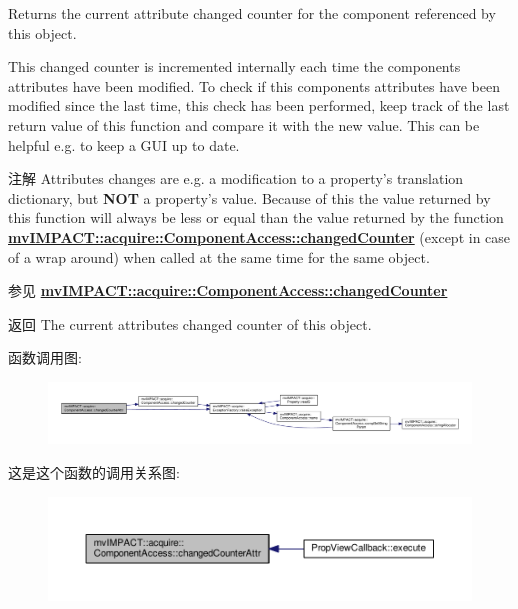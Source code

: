 Returns the current attribute changed counter for the component referenced by this object. 

This changed counter is incremented internally each time the components attributes have been modified. To check if this components attributes have been modified since the last time, this check has been performed, keep track of the last return value of this function and compare it with the new value. This can be helpful e.\+g. to keep a G\+U\+I up to date.

\begin{DoxyNote}{注解}
Attributes changes are e.\+g. a modification to a property's translation dictionary, but {\bfseries N\+O\+T} a property's value. Because of this the value returned by this function will always be less or equal than the value returned by the function {\bfseries \hyperlink{classmv_i_m_p_a_c_t_1_1acquire_1_1_component_access_a9f1ce26fe668a03990316e35882ef82d}{mv\+I\+M\+P\+A\+C\+T\+::acquire\+::\+Component\+Access\+::changed\+Counter}} (except in case of a wrap around) when called at the same time for the same object. 
\end{DoxyNote}
\begin{DoxySeeAlso}{参见}
{\bfseries \hyperlink{classmv_i_m_p_a_c_t_1_1acquire_1_1_component_access_a9f1ce26fe668a03990316e35882ef82d}{mv\+I\+M\+P\+A\+C\+T\+::acquire\+::\+Component\+Access\+::changed\+Counter}} 
\end{DoxySeeAlso}
\begin{DoxyReturn}{返回}
The current attributes changed counter of this object. 
\end{DoxyReturn}


函数调用图\+:
\nopagebreak
\begin{figure}[H]
\begin{center}
\leavevmode
\includegraphics[width=350pt]{classmv_i_m_p_a_c_t_1_1acquire_1_1_component_access_a85e01578b604a92613cdd692947ba3f1_cgraph}
\end{center}
\end{figure}




这是这个函数的调用关系图\+:
\nopagebreak
\begin{figure}[H]
\begin{center}
\leavevmode
\includegraphics[width=350pt]{classmv_i_m_p_a_c_t_1_1acquire_1_1_component_access_a85e01578b604a92613cdd692947ba3f1_icgraph}
\end{center}
\end{figure}


